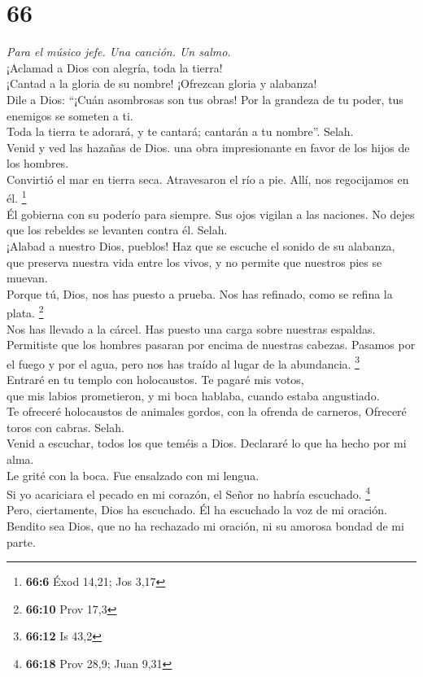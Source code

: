 \hypertarget{section-64}{%
\section{66}\label{section-64}}

\emph{Para el músico jefe. Una canción. Un salmo.}\\
 ¡Aclamad a Dios con alegría, toda la tierra!\\
 ¡Cantad a la gloria de su nombre! ¡Ofrezcan gloria y
alabanza!\\
 Dile a Dios: ``¡Cuán asombrosas son tus obras! Por la
grandeza de tu poder, tus enemigos se someten a ti.\\
 Toda la tierra te adorará, y te cantará; cantarán a tu
nombre''. Selah.\\
 Venid y ved las hazañas de Dios. una obra impresionante
en favor de los hijos de los hombres.\\
 Convirtió el mar en tierra seca. Atravesaron el río a
pie. Allí, nos regocijamos en él. \footnote{\textbf{66:6} Éxod 14,21;
  Jos 3,17}\\
 Él gobierna con su poderío para siempre. Sus ojos vigilan
a las naciones. No dejes que los rebeldes se levanten contra él.
Selah.\\
 ¡Alabad a nuestro Dios, pueblos! Haz que se escuche el
sonido de su alabanza,\\
 que preserva nuestra vida entre los vivos, y no permite
que nuestros pies se muevan.\\
 Porque tú, Dios, nos has puesto a prueba. Nos has
refinado, como se refina la plata. \footnote{\textbf{66:10} Prov 17,3}\\
 Nos has llevado a la cárcel. Has puesto una carga sobre
nuestras espaldas.\\
 Permitiste que los hombres pasaran por encima de
nuestras cabezas. Pasamos por el fuego y por el agua, pero nos has
traído al lugar de la abundancia. \footnote{\textbf{66:12} Is 43,2}\\
 Entraré en tu templo con holocaustos. Te pagaré mis
votos,\\
 que mis labios prometieron, y mi boca hablaba, cuando
estaba angustiado.\\
 Te ofreceré holocaustos de animales gordos, con la
ofrenda de carneros, Ofreceré toros con cabras. Selah.\\
 Venid a escuchar, todos los que teméis a Dios. Declararé
lo que ha hecho por mi alma.\\
 Le grité con la boca. Fue ensalzado con mi lengua.\\
 Si yo acariciara el pecado en mi corazón, el Señor no
habría escuchado. \footnote{\textbf{66:18} Prov 28,9; Juan 9,31}\\
 Pero, ciertamente, Dios ha escuchado. Él ha escuchado la
voz de mi oración.\\
 Bendito sea Dios, que no ha rechazado mi oración, ni su
amorosa bondad de mi parte.

